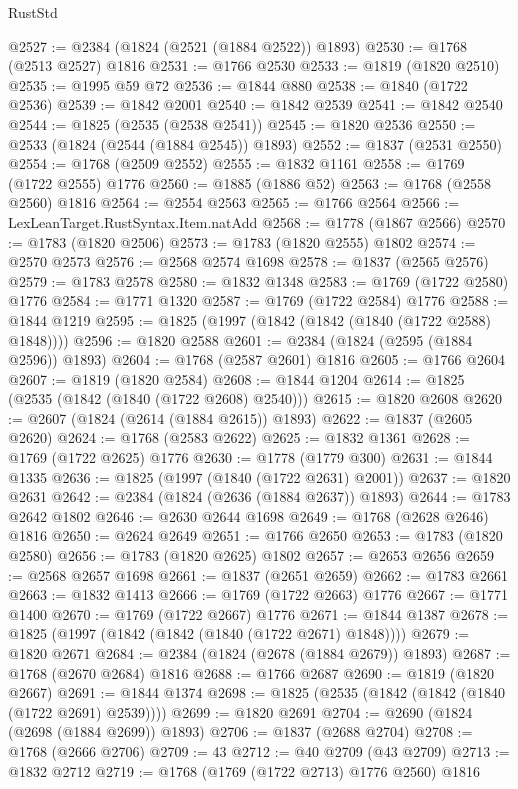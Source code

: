 \begin{lexlean}{RustStd}
\begin{coremodule}
@2527 := @2384 (@1824 (@2521 (@1884 @2522)) @1893)
@2530 := @1768 (@2513 @2527) @1816
@2531 := @1766 @2530
@2533 := @1819 (@1820 @2510)
@2535 := @1995 @59 @72
@2536 := @1844 @880
@2538 := @1840 (@1722 @2536)
@2539 := @1842 @2001
@2540 := @1842 @2539
@2541 := @1842 @2540
@2544 := @1825 (@2535 (@2538 @2541))
@2545 := @1820 @2536
@2550 := @2533 (@1824 (@2544 (@1884 @2545)) @1893)
@2552 := @1837 (@2531 @2550)
@2554 := @1768 (@2509 @2552)
@2555 := @1832 @1161
@2558 := @1769 (@1722 @2555) @1776
@2560 := @1885 (@1886 @52)
@2563 := @1768 (@2558 @2560) @1816
@2564 := @2554 @2563
@2565 := @1766 @2564
@2566 := LexLeanTarget.RustSyntax.Item.natAdd
@2568 := @1778 (@1867 @2566)
@2570 := @1783 (@1820 @2506)
@2573 := @1783 (@1820 @2555) @1802
@2574 := @2570 @2573
@2576 := @2568 @2574 @1698
@2578 := @1837 (@2565 @2576)
@2579 := @1783 @2578
@2580 := @1832 @1348
@2583 := @1769 (@1722 @2580) @1776
@2584 := @1771 @1320
@2587 := @1769 (@1722 @2584) @1776
@2588 := @1844 @1219
@2595 := @1825 (@1997 (@1842 (@1842 (@1840 (@1722 @2588) @1848))))
@2596 := @1820 @2588
@2601 := @2384 (@1824 (@2595 (@1884 @2596)) @1893)
@2604 := @1768 (@2587 @2601) @1816
@2605 := @1766 @2604
@2607 := @1819 (@1820 @2584)
@2608 := @1844 @1204
@2614 := @1825 (@2535 (@1842 (@1840 (@1722 @2608) @2540)))
@2615 := @1820 @2608
@2620 := @2607 (@1824 (@2614 (@1884 @2615)) @1893)
@2622 := @1837 (@2605 @2620)
@2624 := @1768 (@2583 @2622)
@2625 := @1832 @1361
@2628 := @1769 (@1722 @2625) @1776
@2630 := @1778 (@1779 @300)
@2631 := @1844 @1335
@2636 := @1825 (@1997 (@1840 (@1722 @2631) @2001))
@2637 := @1820 @2631
@2642 := @2384 (@1824 (@2636 (@1884 @2637)) @1893)
@2644 := @1783 @2642 @1802
@2646 := @2630 @2644 @1698
@2649 := @1768 (@2628 @2646) @1816
@2650 := @2624 @2649
@2651 := @1766 @2650
@2653 := @1783 (@1820 @2580)
@2656 := @1783 (@1820 @2625) @1802
@2657 := @2653 @2656
@2659 := @2568 @2657 @1698
@2661 := @1837 (@2651 @2659)
@2662 := @1783 @2661
@2663 := @1832 @1413
@2666 := @1769 (@1722 @2663) @1776
@2667 := @1771 @1400
@2670 := @1769 (@1722 @2667) @1776
@2671 := @1844 @1387
@2678 := @1825 (@1997 (@1842 (@1842 (@1840 (@1722 @2671) @1848))))
@2679 := @1820 @2671
@2684 := @2384 (@1824 (@2678 (@1884 @2679)) @1893)
@2687 := @1768 (@2670 @2684) @1816
@2688 := @1766 @2687
@2690 := @1819 (@1820 @2667)
@2691 := @1844 @1374
@2698 := @1825 (@2535 (@1842 (@1842 (@1840 (@1722 @2691) @2539))))
@2699 := @1820 @2691
@2704 := @2690 (@1824 (@2698 (@1884 @2699)) @1893)
@2706 := @1837 (@2688 @2704)
@2708 := @1768 (@2666 @2706)
@2709 := 43
@2712 := @40 @2709 (@43 @2709)
@2713 := @1832 @2712
@2719 := @1768 (@1769 (@1722 @2713) @1776 @2560) @1816

\end{coremodule}
\end{lexlean}
